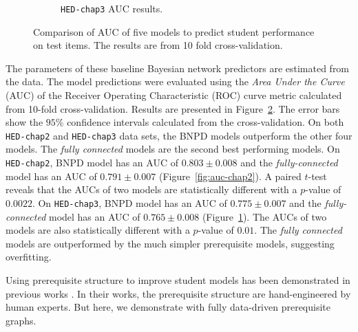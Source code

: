 \documentclass{edm_template}
\newcommand{\hl}[1]{\colorbox{yellow}{#1}}
\begin{document}
{\begin{figure}[!ht]
\begin{subfigure}[b]{0.48\linewidth}
			\caption{\texttt{HED-chap3} AUC results.}
			\label{fig:auc-chap3}
		\end{subfigure}%
		\caption{Comparison of AUC of five models to predict student performance on test items. The results are from 10 fold cross-validation.\label{fig:aucs}}
	\end{figure} 	
	
	The parameters of these baseline Bayesian network predictors are estimated from the data.
	The model predictions were evaluated using the \textit{Area Under the Curve} (AUC) of the Receiver Operating Characteristic (ROC) curve metric 
	calculated from 10-fold cross-validation.
	Results are presented in Figure~\ref{fig:aucs}. 
	The error bars show the $95\%$ confidence intervals calculated from the cross-validation.
	On both \texttt{HED-chap2} and \texttt{HED-chap3} data sets, the BNPD models outperform the other four models.
	The \emph{fully connected} models are the second best performing models.
	On \texttt{HED-chap2}, BNPD model has an AUC of $0.803\pm0.008$ and the \emph{fully-connected} model has an AUC of $0.791\pm0.007$ (Figure~\ref{fig:auc-chap2}).
	A paired $t$-test reveals that the AUCs of two models are statistically different with a $p$-value of $0.0022$.
	On \texttt{HED-chap3}, BNPD model has an AUC of $0.775\pm0.007$ and the \emph{fully-connected} model has an AUC of $0.765\pm0.008$ (Figure~\ref{fig:auc-chap3}).
	The AUCs of two models are also statistically different with a $p$-value of $0.01$.
	The \emph{fully connected} models are outperformed by the much simpler prerequisite models, suggesting overfitting.
	
	Using prerequisite structure to improve student models has been demonstrated in previous works \cite{kaser2014beyond, botelho2015prediction}.
	In their works, the prerequisite structure are hand-engineered by human experts. But here, we demonstrate with fully data-driven prerequisite graphs.
	
	
}
\end{document}
